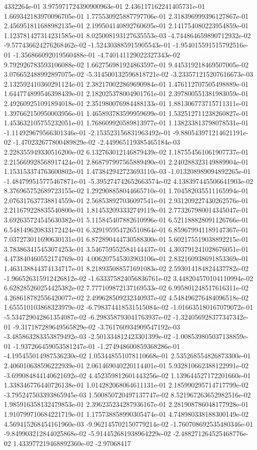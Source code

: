 4332264e-01	3.975971724390900963e-01	2.436117162241405731e-01	1.669342183970096705e-01	1.775530925887797706e-01	2.318396999396127867e-01	2.456951811688982135e-01	2.199504140892760695e-01	2.141754080223954859e-01	1.123781427314231585e-01	8.025008193127635553e-03	-4.744864659890712932e-02	-9.577436624276268462e-02	-1.524303885915905543e-01	-1.954015591515792516e-01	-1.356866092019560488e-01	-4.740141129022327343e-02	9.792926783593106088e-02	1.662756981924863597e-01	9.445319218469507005e-02	3.076652488992897075e-02	-5.314500132596818721e-02	-3.233571215207616673e-03	2.132592410360291124e-01	2.382170022869690984e-01	1.476112707505498889e-01	1.644774899546398439e-01	2.182025378004901761e-01	2.397800551381983059e-01	2.492609251091894018e-01	2.351980076984488133e-01	1.881306773715711311e-01	1.397662150950003956e-01	1.465893783599959699e-01	1.532512711238260827e-01	1.453632105755232051e-01	1.768609920589813977e-01	1.138233813798078531e-01	-1.114929679566301346e-01	-2.153523156831963492e-01	-9.880543971214621191e-02	-1.470232677800489829e-02	-2.449965119385465184e-03	2.228355949330516200e-02	6.132763012146879439e-02	1.187554561061907737e-01	2.215669928568917424e-01	2.868797997565889490e-01	2.240288323149889904e-01	1.153153374763600802e-01	1.473842942723693110e-03	-1.013208989094892265e-01	-1.484799515775467871e-01	-5.395274742652663574e-02	4.138397445506641903e-02	8.376965752689723155e-02	1.292908858044665710e-01	1.704582035511165994e-01	2.076317637738814559e-01	2.568538927036097541e-01	2.931209227430262576e-01	2.211679228835540800e-01	1.814532093332749119e-01	2.773267980014345047e-01	3.692635724545630382e-01	5.115845407882610996e-01	6.521188828091126766e-01	6.548149620833172424e-01	6.329195954726510864e-01	6.859679941189147367e-01	7.037273011690630131e-01	6.872890444730588300e-01	5.602175519038892215e-01	3.783863415453074253e-01	3.546759552584144437e-01	4.303791241028676051e-01	4.473840460552174769e-01	4.006207545303903106e-01	2.832160938691853369e-01	1.463138844374134717e-01	8.218935088571691083e-02	2.593014184824437782e-02	-1.966526315912426812e-02	-1.633375824056836761e-02	3.448204570104110994e-02	6.628285260254425382e-02	7.777109872137169533e-02	6.995801248517616311e-02	4.268618782556420077e-02	2.499628509232340937e-02	4.548496276484096518e-02	1.655510103868323979e-02	-6.798374418531515084e-02	-1.016635180167079072e-01	-5.534729042861354087e-02	-6.298358793041763937e-02	-1.324056928377347342e-01	-9.317187289649565829e-02	-3.761760934909547192e-03	-3.485863283353879492e-03	-2.501334812423301399e-02	-1.008539805037138859e-01	-1.937266459053581247e-01	-1.274948600859368286e-01	-4.195455014987536230e-02	1.053448551078110668e-01	2.535268554826873300e-01	2.406010638596222939e-01	2.061469040220114401e-01	5.932810662388122991e-02	-3.699084844140621692e-02	4.452359812601443256e-02	1.139644527172201660e-01	1.338346776440726138e-01	1.014282068064611131e-01	2.185990295714717799e-02	-3.795247503393865945e-03	1.500850720497137747e-02	8.521967263652982516e-02	1.985916358132479853e-01	2.396235234287936167e-01	2.281908786048177928e-01	1.910799710684221719e-01	1.175738858990305474e-01	4.748980338188300149e-02	4.569415268454161960e-03	-9.962145702150779214e-02	-1.760708692535480346e-01	-9.849903212844025868e-02	-5.914452681938964229e-02	-2.488271264525468776e-02	1.433977219468892360e-02	-2.97068417